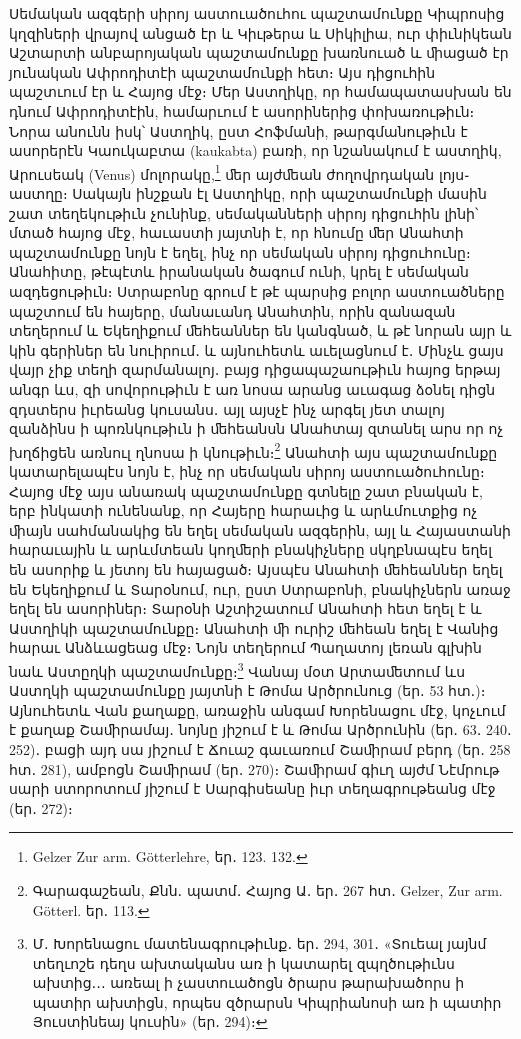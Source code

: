 \documentclass{article}
\begin{document}
{Սեմական ազգերի սիրոյ աստուածուհու պաշտամունքը Կիպրոսից կղզիների վրայով անցած էր և Կիւթերա և Սիկիլիա, ուր փիւնիկեան Աշտարտի անբարոյական պաշտամունքը խառնուած և ﬕացած էր յունական Ափրոդիտէի պաշտամունքի հետ։ Այս դիցուհին պաշտւում էր և Հայոց մէջ։ Մեր Աստղիկը, որ համապատասխան են դնում Ափրոդիտէին, համարւում է ասորիներից փոխառութիւն։ Նորա անունն իսկ՝ Աստղիկ, ըստ Հոֆմանի, թարգմանութիւն է ասորերէն Կաուկաբտա (kaukabta) բառի, որ նշանակում է աստղիկ, Արուսեակ (Venus) մոլորակը,\footnote{Gelzer Zur arm. Götterlehre, եր․ 123. 132.} ﬔր այժﬔան ժողովրդական լոյս֊աստղը։ Սակայն ինշքան էլ Աստղիկը, որի պաշտամունքի մասին շատ տեղեկութիւն չունինք, սեմականների սիրոյ դիցուհին լինի՝ մտած հայոց մէջ, հաւաստի յայտնի է, որ հնումը ﬔր Անահտի պաշտամունքը նոյն է եղել, ինչ որ սեմական սիրոյ դիցուհունը։ Անահիտը, թէպէտև իրանական ծագում ունի, կրել է սեմական ազդեցութիւն։ Ստրաբոնը գրում է թէ պարսից բոլոր աստուածները պաշտում են հայերը, մանաւանդ Անահտին, որին զանազան տեղերում և Եկեղիքում ﬔհեաններ են կանգնած, և թէ նորան այր և կին գերիներ են նուիրում․ և այնուհետև աւելացնում է․ Մինչև ցայս վայր չիք տեղի զարմանալոյ․ բայց դիցապաշաութիւն հայոց երթայ անգր ևս, զի սովորութիւն է առ նոսա արանց աւագաց ձօնել դիցն զդստերս իւրեանց կուսանս․ այլ այսչէ ինչ արգել յետ տալոյ զանձինս ի պոռնկութիւն ի ﬔհեանսն Անահտայ զտանել արս որ ոչ խղճիցեն առնուլ ղնոսա ի կնութիւն։\footnote{Գարագաշեան, Քնն․ պատմ․ Հայոց Ա․ եր․ 267 հտ․ Gelzer, Zur arm. Götterl. եր․ 113.} Անահտի այս պաշտամունքը կատարելապէս նոյն է, ինչ որ սեմական սիրոյ աստուածուհունը։ Հայոց մէջ այս անառակ պաշտամունքը գտնելը շատ բնական է, երբ ինկատի ունենանք, որ Հայերը հարաւից և արևմուտքից ոչ ﬕայն սահմանակից են եղել սեմական ազգերին, այլ և Հայաստանի հարաւային և արևմտեան կողﬔրի բնակիչները սկղբնապէս եղել են ասորիք և յետոյ են հայացած։ Այսպէս Անահտի ﬔհեաններ եղել են Եկեղիքում և Տարօնում, ուր, ըստ Ստրաբոնի, բնակիչներն առաջ եղել են ասորիներ։ Տարօնի Աշտիշատում Անահտի հետ եղել է և Աստղիկի պաշտամունքը։ Անահտի ﬕ ուրիշ ﬔհեան եղել է Վանից հարաւ Անձևացեաց մէջ։ Նոյն տեղերում Պաղատոյ լեռան գլխին նաև Աստըղկի պաշտամունքը։\footnote{Մ․ Խորենացու մատենագրութիւնք․ եր․ 294, 301․ «Տուեալ յայնմ տեղւոշե դեղս ախտականս առ ի կատարել զպղծութիւնս ախտից․․․ առեալ ի չաստուածոցն ծրարս թարախածորս ի պատիր ախտիցն, որպես զծրարսն Կիպրիանոսի առ ի պատիր Յուստինեայ կուսին» (եր․ 294)։} Վանայ մօտ Արտաﬔտում ևս Աստղկի պաշտամունքը յայտնի է Թոմա Արծրունուց (եր․ 53 հտ․)։ Այնուհետև Վան քաղաքը, առաջին անգամ Խորենացու մէջ, կոչւում է քաղաք Շաﬕրամայ․ նոյնը յիշում է և Թոմա Արծրունին (եր․ 63․ 240․ 252)․ բացի այդ սա յիշում է Ճուաշ գաւառում Շաﬕրամ բերդ (եր․ 258 հտ․ 281), ամբոցն Շաﬕրամ (եր․ 270)։ Շաﬕրամ գիւղ այժմ Նէմրութ սարի ստորոտում յիշում է Սարգիսեանը իւր տեղագրութեանց մէջ (եր․ 272)։

}
\end{document}
